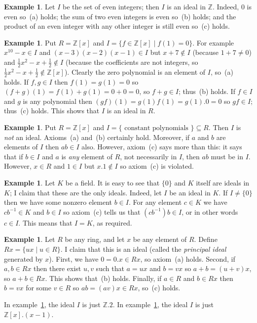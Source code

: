 \documentclass{amsart}
\newcommand{\Z}         {{\mathbb{Z}}}
\newcommand{\st}        {\;|\;}
\newcommand{\half}      {{\textstyle\frac{1}{2}}}
\newcommand{\sse}       {\subseteq}
\renewcommand{\:}{\colon}
\theoremstyle{definition}
\newtheorem{example}[theorem]{Example}
\begin{document}
\begin{example}\label{eg-even}
 Let $I$ be the set of even integers; then $I$ is an ideal in $\Z$.
 Indeed, $0$ is even so~(a) holds; the sum of two even integers is
 even so~(b) holds; and the product of an even integer with any other
 integer is still even so~(c) holds.
\end{example}
\begin{example}\label{eg-ker-eval}
 Put $R=\Z[x]$ and $I=\{f\in\Z[x]\st f(1)=0\}$.  For example
 $x^{10}-x\in I$ and $(x-3)(x-2)(x-1)\in I$ but $x+7\not\in I$
 (because $1+7\neq 0$) and $\half x^2-x+\half\not\in I$ (because the
 coefficients are not integers, so $\half x^2-x+\half\not\in\Z[x]$).
 Clearly the zero polynomial is an element of $I$, so~(a) holds.  If
 $f,g\in I$ then $f(1)=g(1)=0$ so $(f+g)(1)=f(1)+g(1)=0+0=0$, so
 $f+g\in I$; thus~(b) holds.  If $f\in I$ and $g$ is any polynomial
 then $(gf)(1)=g(1)f(1)=g(1).0=0$ so $gf\in I$; thus~(c) holds.  This
 shows that $I$ is an ideal in $R$.
\end{example}
\begin{example}\label{eg-const}
 Put $R=\Z[x]$ and $I=\{\text{ constant polynomials }\}\sse R$.
 Then $I$ is \emph{not} an ideal.  Axioms~(a) and~(b) certainly hold.
 Moreover, if $a$ and $b$ are elements of $I$ then $ab\in I$ also.
 However, axiom~(c) says more than this: it says that if $b\in I$ and
 $a$ is \emph{any} element of $R$, not necessarily in $I$, then $ab$
 must be in $I$.  However, $x\in R$ and $1\in I$ but $x.1\not\in I$ so
 axiom~(c) is violated.
\end{example}
\begin{example}\label{eg-field-ideal}
 Let $K$ be a field.  It is easy to see that $\{0\}$ and $K$ itself
 are ideals in $K$; I claim that these are the only ideals.  Indeed,
 let $I$ be an ideal in $K$.  If $I\neq\{0\}$ then we have some
 nonzero element $b\in I$.  For any element $c\in K$ we have
 $cb^{-1}\in K$ and $b\in I$ so axiom~(c) tells us that
 $(cb^{-1})b\in I$, or in other words $c\in I$.  This means that
 $I=K$, as required.
\end{example}
\begin{example}\label{eg-principal}
 Let $R$ be any ring, and let $x$ be any element of $R$.  Define
 $Rx=\{ux\st u\in R\}$.  I claim that this is an ideal (called the
 \emph{principal ideal} generated by $x$).  First, we have $0=0.x\in
 Rx$, so axiom~(a) holds.  Second, if $a,b\in Rx$ then there exist
 $u,v$ such that $a=ux$ and $b=vx$ so $a+b=(u+v)x$, so $a+b\in Rx$.
 This shows that~(b) holds.  Finally, if $a\in R$ and $b\in Rx$ then
 $b=vx$ for some $v\in R$ so $ab=(av)x\in Rx$, so~(c) holds. 

 In example~\ref{eg-even}, the ideal $I$ is just $\Z.2$.  In
 example~\ref{eg-ker-eval}, the ideal $I$ is just $\Z[x].(x-1)$.
\end{example}
\end{document}
